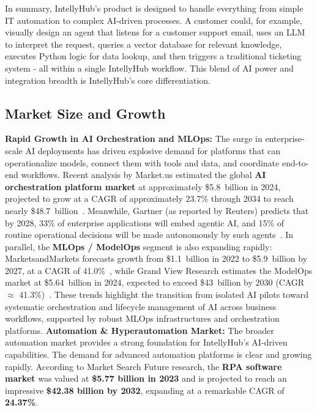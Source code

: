 \documentclass[11pt, a4paper, oneside]{article}
\begin{document}
In summary, IntellyHub's product is designed to handle everything from simple IT automation to complex AI-driven processes. A customer could, for example, visually design an agent that listens for a customer support email, uses an LLM to interpret the request, queries a vector database for relevant knowledge, executes Python logic for data lookup, and then triggers a traditional ticketing system - all within a single IntellyHub workflow. This blend of AI power and integration breadth is IntellyHub's core differentiation.

\subsection{Market Size and Growth}
\textbf{Rapid Growth in AI Orchestration and MLOps:} The surge in enterprise-scale AI deployments has driven explosive demand for platforms that can operationalize models, connect them with tools and data, and coordinate end-to-end workflows. 
Recent analysis by Market.us estimated the global \textbf{AI orchestration platform market} at approximately \$5.8~billion in 2024, projected to grow at a CAGR of approximately 23.7\% through 2034 to reach nearly \$48.7~billion~\cite{AIOrch}. 
Meanwhile, Gartner (as reported by Reuters) predicts that by 2028, 33\% of enterprise applications will embed agentic AI, and 15\% of routine operational decisions will be made autonomously by such agents~\cite{GartnerAgentic}. 
In parallel, the \textbf{MLOps / ModelOps} segment is also expanding rapidly: MarketsandMarkets forecasts growth from \$1.1~billion in 2022 to \$5.9~billion by 2027, at a CAGR of 41.0\%~\cite{MLOpsMM}, while Grand View Research estimates the ModelOps market at \$5.64~billion in 2024, expected to exceed \$43~billion by 2030 (CAGR $\approx$ 41.3\%)~\cite{ModelOpsGV}. 
These trends highlight the transition from isolated AI pilots toward systematic orchestration and lifecycle management of AI across business workflows, supported by robust MLOps infrastructures and orchestration platforms.\newline\newline
\textbf{Automation \& Hyperautomation Market:} The broader automation market provides a strong foundation for IntellyHub's AI-driven capabilities. The demand for advanced automation platforms is clear and growing rapidly. According to Market Search Future research, the \textbf{RPA software market} was valued at \textbf{\$5.77 billion in 2023} and is projected to reach an impressive \textbf{\$42.38 billion by 2032}, expanding at a remarkable CAGR of \textbf{24.37\%}\cite{mrfRPA}.
\end{document}
